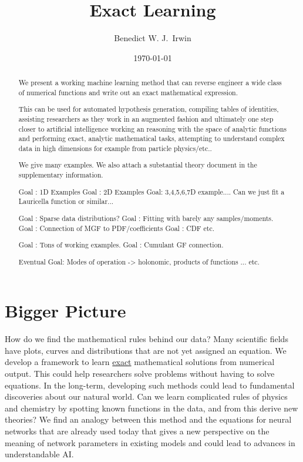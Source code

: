 \documentclass{article}
\title{Exact Learning}
\date{\today}
\begin{document}
%

\author[1]{Benedict W. J.~Irwin}


\maketitle

\begin{abstract}
We present a working machine learning method that can reverse engineer a wide class of numerical functions and write out an exact mathematical expression.

This can be used for automated hypothesis generation, compiling tables of identities, assisting researchers as they work in an augmented fashion and ultimately one step closer to artificial intelligence working an reasoning with the space of analytic functions and performing exact, analytic mathematical tasks, attempting to understand complex data in high dimensions for example from particle physics/etc..

We give many examples.
We also attach a substantial theory document in the supplementary information.

Goal : 1D Examples
Goal : 2D Examples
Goal:   3,4,5,6,7D example.... Can we just fit a Lauricella function or similar...


Goal : Sparse data distributions?
Goal : Fitting with barely any samples/moments.
Goal : Connection of MGF to PDF/coefficients
Goal : CDF etc.

Goal : Tons of working examples.
Goal : Cumulant GF connection.

Eventual Goal: Modes of operation -> holonomic, products of functions ... etc.

\end{abstract}


\section{Bigger Picture}
How do we find the mathematical rules behind our data? Many scientific fields have plots, curves and distributions that are not yet assigned an equation. We develop a framework to learn \underline{exact} mathematical solutions from numerical output. This could help researchers solve problems without having to solve equations.
In the long-term, developing such methods could lead to fundamental discoveries about our natural world. Can we learn complicated rules of physics and chemistry by spotting known functions in the data, and from this derive new theories?
We find an analogy between this method and the equations for neural networks that are already used today that gives a new perspective on the meaning of network parameters in existing models and could lead to advances in understandable AI. 
\end{document}
